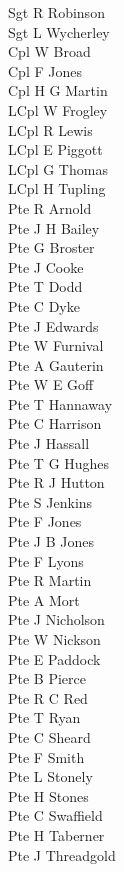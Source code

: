 \begin{multicols}{2}
  \noindent
  Sgt R Robinson \\
  Sgt L Wycherley \\
  Cpl W Broad \\
  Cpl F Jones \\
  Cpl H G Martin \\
  LCpl W Frogley \\
  LCpl R Lewis \\
  LCpl E Piggott \\
  LCpl G Thomas \\
  LCpl H Tupling \\
  Pte R Arnold \\
  Pte J H Bailey \\
  Pte G Broster \\
  Pte J Cooke \\
  Pte T Dodd \\
  Pte C Dyke \\
  Pte J Edwards \\
  Pte W Furnival \\
  Pte A Gauterin \\
  Pte W E Goff \\
  Pte T Hannaway \\
  Pte C Harrison \\
  Pte J Hassall \\
  Pte T G Hughes \\
  Pte R J Hutton \\
  Pte S Jenkins \\
  Pte F Jones \\
  Pte J B Jones \\
  Pte F Lyons \\
  Pte R Martin \\
  Pte A Mort \\
  Pte J Nicholson \\
  Pte W Nickson \\
  Pte E Paddock \\
  Pte B Pierce \\
  Pte R C Red \\
  Pte T Ryan \\
  Pte C Sheard \\
  Pte F Smith \\
  Pte L Stonely \\
  Pte H Stones \\
  Pte C Swaffield \\
  Pte H Taberner \\
  Pte J Threadgold \\

\end{multicols}

